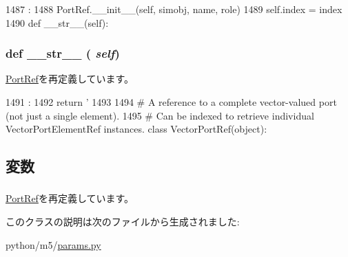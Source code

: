 \begin{DoxyCode}
1487                                                  :
1488         PortRef.__init__(self, simobj, name, role)
1489         self.index = index
1490 
    def __str__(self):
\end{DoxyCode}
\hypertarget{classm5_1_1params_1_1VectorPortElementRef_aa7a4b9bc0941308e362738503137460e}{
\subsubsection[{\_\-\_\-str\_\-\_\-}]{\setlength{\rightskip}{0pt plus 5cm}def \_\-\_\-str\_\-\_\- ( {\em self})}}
\label{classm5_1_1params_1_1VectorPortElementRef_aa7a4b9bc0941308e362738503137460e}


\hyperlink{classm5_1_1params_1_1PortRef_aa7a4b9bc0941308e362738503137460e}{PortRef}を再定義しています。


\begin{DoxyCode}
1491                      :
1492         return '%
1493 
1494 # A reference to a complete vector-valued port (not just a single element).
1495 # Can be indexed to retrieve individual VectorPortElementRef instances.
class VectorPortRef(object):
\end{DoxyCode}


\subsection{変数}
\hypertarget{classm5_1_1params_1_1VectorPortElementRef_a6784e1c334dfceb8f017667c0b0f6a3e}{
\subsubsection[{index}]{}}
\label{classm5_1_1params_1_1VectorPortElementRef_a6784e1c334dfceb8f017667c0b0f6a3e}


\hyperlink{classm5_1_1params_1_1PortRef_a6784e1c334dfceb8f017667c0b0f6a3e}{PortRef}を再定義しています。

このクラスの説明は次のファイルから生成されました:\begin{DoxyCompactItemize}
\item 
python/m5/\hyperlink{params_8py}{params.py}\end{DoxyCompactItemize}

